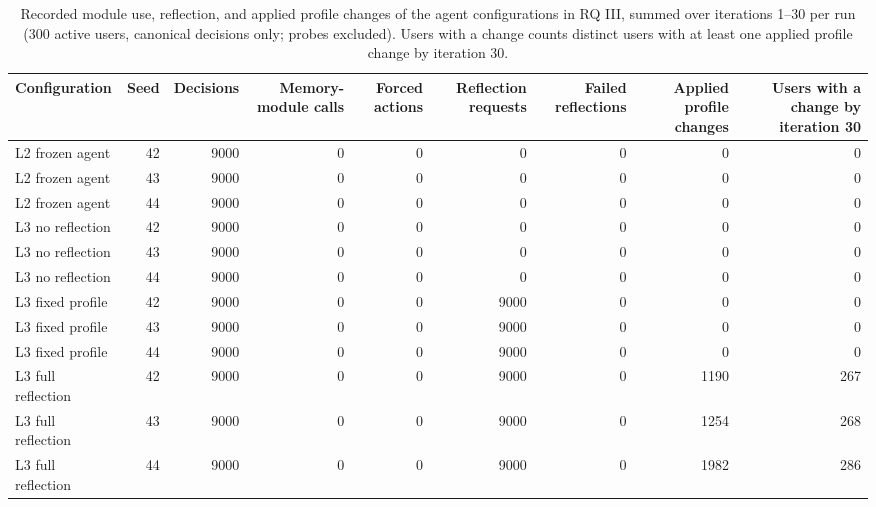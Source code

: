\begin{table}[htbp!]
\centering
\small
\setlength{\tabcolsep}{3pt}
\renewcommand{\arraystretch}{1.1}
\begin{tabular}{lrrrrrrrr}
\hline
Configuration & Seed & Decisions & Memory-module calls & Forced actions & Reflection requests & Failed reflections & Applied profile changes & Users with a change by iteration 30 \\
\hline
L2 frozen agent & 42 & 9000 & 0 & 0 & 0 & 0 & 0 & 0 \\
L2 frozen agent & 43 & 9000 & 0 & 0 & 0 & 0 & 0 & 0 \\
L2 frozen agent & 44 & 9000 & 0 & 0 & 0 & 0 & 0 & 0 \\
L3 no reflection & 42 & 9000 & 0 & 0 & 0 & 0 & 0 & 0 \\
L3 no reflection & 43 & 9000 & 0 & 0 & 0 & 0 & 0 & 0 \\
L3 no reflection & 44 & 9000 & 0 & 0 & 0 & 0 & 0 & 0 \\
L3 fixed profile & 42 & 9000 & 0 & 0 & 9000 & 0 & 0 & 0 \\
L3 fixed profile & 43 & 9000 & 0 & 0 & 9000 & 0 & 0 & 0 \\
L3 fixed profile & 44 & 9000 & 0 & 0 & 9000 & 0 & 0 & 0 \\
L3 full reflection & 42 & 9000 & 0 & 0 & 9000 & 0 & 1190 & 267 \\
L3 full reflection & 43 & 9000 & 0 & 0 & 9000 & 0 & 1254 & 268 \\
L3 full reflection & 44 & 9000 & 0 & 0 & 9000 & 0 & 1982 & 286 \\
\hline
\end{tabular}
\caption{Recorded module use, reflection, and applied profile changes of the agent configurations in RQ III, summed over iterations 1--30 per run (300 active users, canonical decisions only; probes excluded). Users with a change counts distinct users with at least one applied profile change by iteration 30.}
\label{chap:results:tab:main_rq3_agent_module_use}
\end{table}
